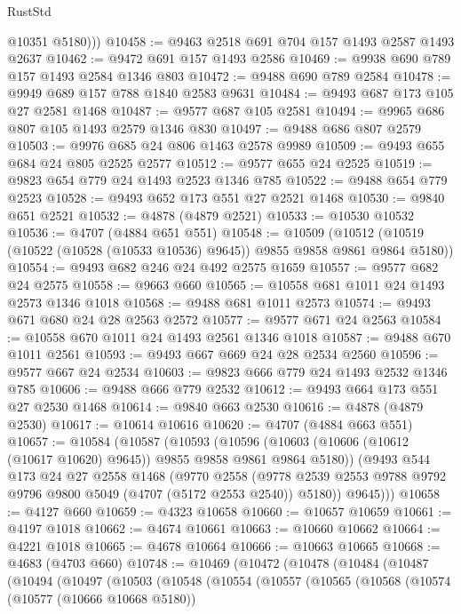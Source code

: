 \begin{lexlean}{RustStd}
\begin{coremodule}
          @10351
          @5180)))
@10458 := @9463 @2518 @691 @704 @157 @1493 @2587 @1493 @2637
@10462 := @9472 @691 @157 @1493 @2586
@10469 := @9938 @690 @789 @157 @1493 @2584 @1346 @803
@10472 := @9488 @690 @789 @2584
@10478 := @9949 @689 @157 @788 @1840 @2583 @9631
@10484 := @9493 @687 @173 @105 @27 @2581 @1468
@10487 := @9577 @687 @105 @2581
@10494 := @9965 @686 @807 @105 @1493 @2579 @1346 @830
@10497 := @9488 @686 @807 @2579
@10503 := @9976 @685 @24 @806 @1463 @2578 @9989
@10509 := @9493 @655 @684 @24 @805 @2525 @2577
@10512 := @9577 @655 @24 @2525
@10519 := @9823 @654 @779 @24 @1493 @2523 @1346 @785
@10522 := @9488 @654 @779 @2523
@10528 := @9493 @652 @173 @551 @27 @2521 @1468
@10530 := @9840 @651 @2521
@10532 := @4878 (@4879 @2521)
@10533 := @10530 @10532
@10536 := @4707 (@4884 @651 @551)
@10548 := @10509
    (@10512 (@10519 (@10522 (@10528 (@10533 @10536) @9645)) @9855 @9858 @9861 @9864 @5180))
@10554 := @9493 @682 @246 @24 @492 @2575 @1659
@10557 := @9577 @682 @24 @2575
@10558 := @9663 @660
@10565 := @10558 @681 @1011 @24 @1493 @2573 @1346 @1018
@10568 := @9488 @681 @1011 @2573
@10574 := @9493 @671 @680 @24 @28 @2563 @2572
@10577 := @9577 @671 @24 @2563
@10584 := @10558 @670 @1011 @24 @1493 @2561 @1346 @1018
@10587 := @9488 @670 @1011 @2561
@10593 := @9493 @667 @669 @24 @28 @2534 @2560
@10596 := @9577 @667 @24 @2534
@10603 := @9823 @666 @779 @24 @1493 @2532 @1346 @785
@10606 := @9488 @666 @779 @2532
@10612 := @9493 @664 @173 @551 @27 @2530 @1468
@10614 := @9840 @663 @2530
@10616 := @4878 (@4879 @2530)
@10617 := @10614 @10616
@10620 := @4707 (@4884 @663 @551)
@10657 := @10584
    (@10587
      (@10593
        (@10596 (@10603 (@10606 (@10612 (@10617 @10620) @9645)) @9855 @9858 @9861 @9864 @5180))
        (@9493
          @544
          @173
          @24
          @27
          @2558
          @1468
          (@9770
            @2558
            (@9778 @2539 @2553 @9788 @9792 @9796 @9800 @5049 (@4707 (@5172 @2553 @2540)) @5180))
          @9645)))
@10658 := @4127 @660
@10659 := @4323 @10658
@10660 := @10657 @10659
@10661 := @4197 @1018
@10662 := @4674 @10661
@10663 := @10660 @10662
@10664 := @4221 @1018
@10665 := @4678 @10664
@10666 := @10663 @10665
@10668 := @4683 (@4703 @660)
@10748 := @10469
    (@10472
      (@10478
        (@10484
          (@10487
            (@10494
              (@10497
                (@10503
                  (@10548
                    (@10554
                      (@10557
                        (@10565
                          (@10568
                            (@10574
                              (@10577 (@10666 @10668 @5180))

\end{coremodule}
\end{lexlean}

